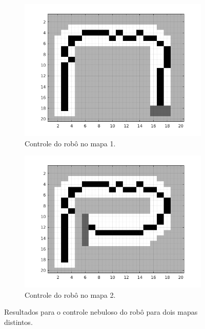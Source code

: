 	\begin{figure}[h!]
	
	\centering
	
		\begin{subfigure}{.5\textwidth}
		  \centering
		  \includegraphics[width=1\linewidth]{fuzzy/test1}
		  \caption{\centering Controle do robô no mapa 1.}
		  \label{fig:test_fuzzy_1}
		  
		\end{subfigure}%
		\begin{subfigure}{.5\textwidth}
		  \centering
		  \includegraphics[width=1\linewidth]{fuzzy/test2}
		  \caption{\centering Controle do robô no mapa 2.}
		  \label{fig:test_fuzzy_2} 
		\end{subfigure}
	
	
	\caption{Resultados para o controle nebuloso do robô
	para dois mapas distintos.}
	\end{figure} 
	
